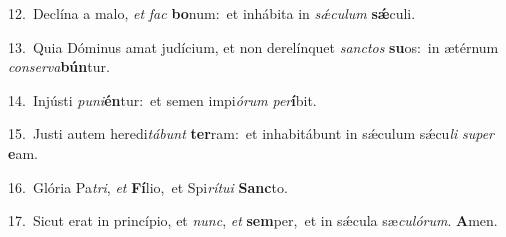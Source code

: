 {\numbfont\textcolor{\numbcolor}{12.}}~Declína a malo, \textit{et} \textit{fac} \textbf{bo}\-num:~\star et inhábita in \textit{sǽ}\-\textit{cu}\textit{lum} \textbf{sǽ}\-culi.\par
{\numbfont\textcolor{\numbcolor}{13.}}~Quia Dóminus amat judícium, et non derelínquet \textit{sanc}\-\textit{tos} \textbf{su}\-os:~\star in ætérnum \textit{con}\-\textit{ser}\textit{va}\textbf{bún}tur.\par
{\numbfont\textcolor{\numbcolor}{14.}}~Injústi \textit{pu}\-\textit{ni}\textbf{én}tur:~\star et semen impi\-\textit{ó}\-\textit{rum} \textit{per}\-\textbf{í}bit.\par
{\numbfont\textcolor{\numbcolor}{15.}}~Justi autem heredi\-\textit{tá}\-\textit{bunt} \textbf{ter}\-ram:~\star et inhabitábunt in sǽculum sǽcu\textit{li} \textit{su}\-\textit{per} \textbf{e}\-am.\par
{\numbfont\textcolor{\numbcolor}{16.}}~Glória Pa\-\textit{tri}\-, \textit{et} \textbf{Fí}\-lio,~\star et Spi\-\textit{rí}\-\textit{tu}\textit{i} \textbf{Sanc}\-to.\par
{\numbfont\textcolor{\numbcolor}{17.}}~Sicut erat in princípio, et \textit{nunc}\-, \textit{et} \textbf{sem}\-per,~\star et in sǽcula sæ\-\textit{cu}\-\textit{ló}\textit{rum}. \textbf{A}\-men.\par
